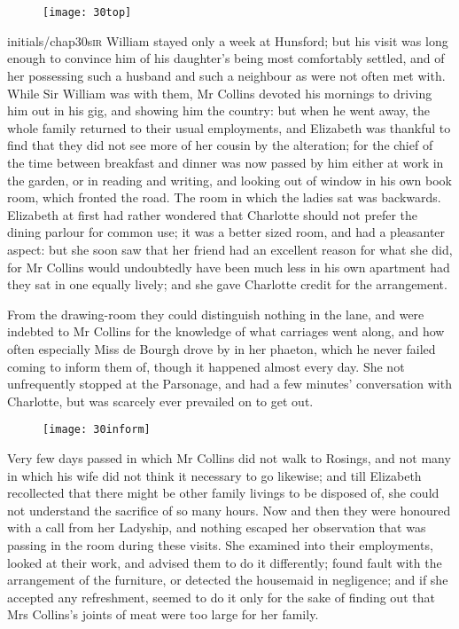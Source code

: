 \chapter[Chapter \thechapter]{}
	
\begin{figure}[t!]
\centering
\texttt{[image: 30top]}
\end{figure}


\lettrine[lines=6,image=true]{initials/chap30s}{ir}  William stayed only a week at Hunsford; but his visit was long enough to convince him of his daughter's being most comfortably settled, and of her possessing such a husband and such a neighbour as were not often met with. While Sir William was with them, Mr Collins devoted his mornings to driving him out in his gig, and showing him the country: but when he went away, the whole family returned to their usual employments, and Elizabeth was thankful to find that they did not see more of her cousin by the alteration; for the chief of the time between breakfast and dinner was now passed by him either at work in the garden, or in reading and writing, and looking out of window in his own book room, which fronted the road. The room in which the ladies sat was backwards. Elizabeth at first had rather wondered that Charlotte should not prefer the dining parlour for common use; it was a better sized room, and had a pleasanter aspect: but she soon saw that her friend had an excellent reason for what she did, for Mr Collins would undoubtedly have been much less in his own apartment had they sat in one equally lively; and she gave Charlotte credit for the arrangement.

From the drawing-room they could distinguish nothing in the lane, and were indebted to Mr Collins for the knowledge of what carriages went along, and how often especially Miss de Bourgh drove by in her phaeton, which he never failed coming to inform them of, though it happened almost every day. She not unfrequently stopped at the Parsonage, and had a few minutes' conversation with Charlotte, but was scarcely ever prevailed on to get out.

\begin{figure}[tbh]
\centering
\texttt{[image: 30inform]}
\end{figure}

Very few days passed in which Mr Collins did not walk to Rosings, and not many in which his wife did not think it necessary to go likewise; and till Elizabeth recollected that there might be other family livings to be disposed of, she could not understand the sacrifice of so many hours. Now and then they were honoured with a call from her Ladyship, and nothing escaped her observation that was passing in the room during these visits. She examined into their employments, looked at their work, and advised them to do it differently; found fault with the arrangement of the furniture, or detected the housemaid in negligence; and if she accepted any refreshment, seemed to do it only for the sake of finding out that Mrs Collins's joints of meat were too large for her family.

